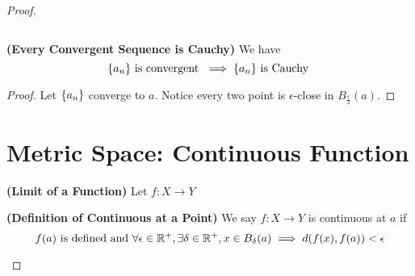 \documentclass{report}
\begin{document}
\begin{proof}
\begin{definition}
\begin{equation}
\end{equation}
\end{definition}
\begin{theorem}
\label{1.7.9}
\textbf{(Every Convergent Sequence is Cauchy)} We have
\begin{equation}
\{ a_n \}\text{ is convergent }\implies \{ a_n \}\text{ is Cauchy }
\end{equation}
\end{theorem}
\begin{proof}
Let $\{ a_n \}$ converge to $a$.  Notice every two point is  $\epsilon$-close in $B_{\frac{\epsilon }{2}}(a)$. 
\end{proof}
\section{Metric Space: Continuous Function}
\begin{definition}
\label{1.8.1}
\textbf{(Limit of a Function)} Let $f:X\rightarrow Y$ 
\end{definition}
\begin{definition}
\label{1.8.2}
\textbf{(Definition of Continuous at a Point)} We say $f:X\rightarrow Y$ is continuous at $a$ if 
 \begin{equation}
f(a)\text{ is defined and }\forall \epsilon\in\mathbb{R}^+,\exists \delta\in\mathbb{R}^+, x\in B_\delta(a)\implies d(f(x),f(a))<\epsilon 
\end{equation}
\end{definition}






\end{proof}
\end{document}
